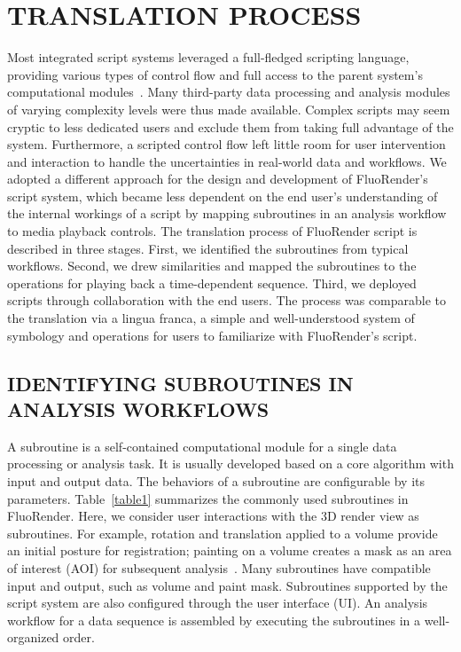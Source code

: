 \documentclass{IEEEcsmag}
\begin{document}
\section{TRANSLATION PROCESS}

Most integrated script systems leveraged a full-fledged scripting language, providing various types of control flow and full access to the parent system’s computational modules~\cite{four}. Many third-party data processing and analysis modules of varying complexity levels were thus made available. Complex scripts may seem cryptic to less dedicated users and exclude them from taking full advantage of the system. Furthermore, a scripted control flow left little room for user intervention and interaction to handle the uncertainties in real-world data and workflows. We adopted a different approach for the design and development of FluoRender’s script system, which became less dependent on the end user’s understanding of the internal workings of a script by mapping subroutines in an analysis workflow to media playback controls. The translation process of FluoRender script is described in three stages. First, we identified the subroutines from typical workflows. Second, we drew similarities and mapped the subroutines to the operations for playing back a time-dependent sequence. Third, we deployed scripts through collaboration with the end users. The process was comparable to the translation via a lingua franca, a simple and well-understood system of symbology and operations for users to familiarize with FluoRender’s script.

\subsection{IDENTIFYING SUBROUTINES IN ANALYSIS WORKFLOWS}

A subroutine is a self-contained computational module for a single data processing or analysis task. It is usually developed based on a core algorithm with input and output data. The behaviors of a subroutine are configurable by its parameters. Table~\ref{table1} summarizes the commonly used subroutines in FluoRender. Here, we consider user interactions with the 3D render view as subroutines. For example, rotation and translation applied to a volume provide an initial posture for registration; painting on a volume creates a mask as an area of interest (AOI) for subsequent analysis~\cite{six}. Many subroutines have compatible input and output, such as volume and paint mask. Subroutines supported by the script system are also configured through the user interface (UI). An analysis workflow for a data sequence is assembled by executing the subroutines in a well-organized order.
\end{document}
